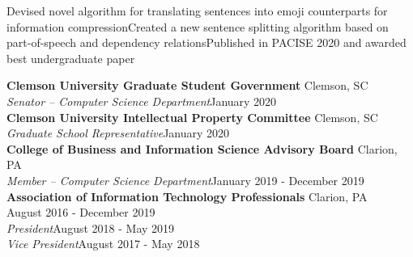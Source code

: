 \documentclass[letter]{article}
\begin{document}

                {Devised novel algorithm for translating sentences into emoji counterparts for information compression}{Created a new sentence splitting algorithm based on part-of-speech and dependency relations}{Published in PACISE 2020 and awarded best undergraduate paper}


                    \textbf{Clemson University Graduate Student Government} \hfill Clemson, SC\\
		    \textit{Senator -- Computer Science Department}\hfill{}January 2020\\
		\vspace{\interspace}
                    \textbf{Clemson University Intellectual Property Committee} \hfill Clemson, SC\\
		    \textit{Graduate School Representative}\hfill{}January 2020\\
		\vspace{\interspace}
                    \textbf{College of Business and Information Science Advisory Board} \hfill Clarion, PA\\
		    \textit{Member -- Computer Science Department}\hfill{}January 2019 - December 2019\\
		\vspace{\interspace}
                    \textbf{Association of Information Technology Professionals} \hfill Clarion, PA\\August 2016 - December 2019\\
		    	\textit{President}\hfill{}August 2018 - May 2019\\
		    	\textit{Vice President}\hfill{}August 2017 - May 2018\\
		\vspace{\interspace}
	    \vspace{-\interspace}



\end{document}
